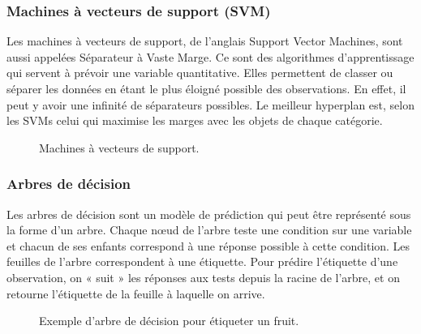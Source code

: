 \subsubsection{Machines à vecteurs de support (SVM)}
Les machines à vecteurs de support, de l'anglais Support Vector Machines, sont aussi appelées Séparateur à Vaste Marge. Ce sont des algorithmes d'apprentissage qui servent à prévoir une variable quantitative. Elles permettent de classer ou séparer les données en étant le plus éloigné possible des observations. En effet, il peut y avoir une infinité de séparateurs possibles. Le meilleur hyperplan est, selon les SVMs celui qui maximise les marges avec les objets de chaque catégorie.
\begin{figure}[H]%
    \center%
    \setlength{\fboxsep}{5pt}%
    \setlength{\fboxrule}{0.5pt}%
    \caption{Machines à vecteurs de support.}%
\end{figure}

\subsubsection{Arbres de décision}
Les arbres de décision sont un modèle de prédiction qui peut être représenté sous la forme d’un arbre. Chaque nœud de l’arbre teste une condition sur une variable et chacun de ses enfants correspond à une réponse possible à cette condition. Les feuilles de l’arbre correspondent à une étiquette.
Pour prédire l’étiquette d’une observation, on « suit » les réponses aux tests depuis la racine de l’arbre, et on retourne l’étiquette de la feuille à laquelle on arrive.
\begin{figure}[H]%
    \center%
    \setlength{\fboxsep}{5pt}%
    \setlength{\fboxrule}{0.5pt}%
    \caption{Exemple d’arbre de décision pour étiqueter un fruit.}%
\end{figure}

